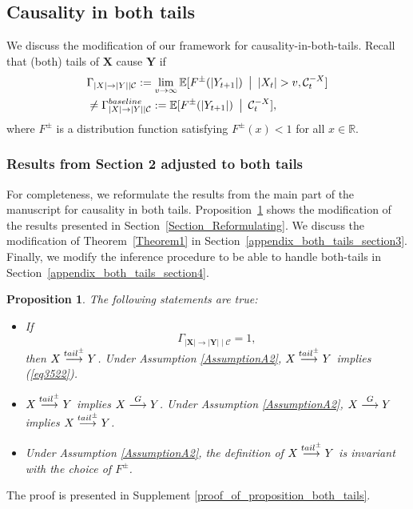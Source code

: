 \documentclass[a4paper,11pt]{article}
\newtheorem{proposition}{Proposition}
\newcommand{\toverset}[2]{\overset{{\rm #1}}{#2}}
\newcommand{\baseline}{{\rm baseline}}
\begin{document}
\subsection{Causality in both tails}\label{Appendix_A_both_tails}

We discuss the modification of our framework for causality-in-both-tails. Recall that (both) tails of $\textbf{X}$ cause $\textbf{Y}$ if 
\begin{equation*}\label{CTC_both_tails}
\begin{split} &\Gamma_{|\textbf{X}|\to|\textbf{Y}|\mid\mathcal{C}}:=  \lim_{v\to\infty} \mathbb{E}[ F^{\pm}(|Y_{t+1}|)\,\,\,\bigr\vert\,\,\, |X_t|>v,\mathcal{C}^{-\textbf{X}}_t]\\ 
&\neq\Gamma_{|\textbf{X}|\to|\textbf{Y}|\mid\mathcal{C}}^{\baseline}:=\mathbb{E}[F^{\pm}(|Y_{t+1}|)\,\,\,\bigr\vert\,\,\,  \mathcal{C}^{-\textbf{X}}_t],    
\end{split}
\end{equation*}
where $F^{\pm}$ is a distribution function satisfying $F^{\pm}(x)<1$ for all $x\in\mathbb{R}$. 


\subsubsection{Results from Section 2 adjusted to both tails}
For completeness, we reformulate the results from the main part of the manuscript for causality in both tails. Proposition~\ref{Proposition_both_tails} shows the modification of the results presented in Section~\ref{Section_Reformulating}.  We discuss the modification of Theorem~\ref{Theorem1} in Section~\ref{appendix_both_tails_section3}. Finally, we modify the inference procedure to be able to handle both-tails in Section~\ref{appendix_both_tails_section4}.



\begin{proposition}\label{Proposition_both_tails}The following statements are true:
\begin{itemize}
    \item If 
\begin{equation}\label{eq3522}
\Gamma_{|\textbf{X}|\to|\textbf{Y}|\mid\mathcal{C}} = 1,
\end{equation}
then $\textbf{X}\toverset{tail^{\pm}}{\longrightarrow}\textbf{Y}$. Under Assumption \ref{AssumptionA2},  $\textbf{X}\toverset{tail^{\pm}}{\longrightarrow}\textbf{Y}$ implies (\ref{eq3522}).
    \item  $\textbf{X}\toverset{tail^{\pm}}{\longrightarrow}\textbf{Y}$ implies $\textbf{X}\toverset{G}{\longrightarrow}\textbf{Y}$. Under Assumption \ref{AssumptionA2},  $\textbf{X}\toverset{G}{\longrightarrow}\textbf{Y}$ implies $\textbf{X}\toverset{tail^{\pm}}{\longrightarrow}\textbf{Y}$. 
    \item  Under Assumption \ref{AssumptionA2}, the definition of  $\textbf{X}\toverset{tail^{\pm}}{\longrightarrow}\textbf{Y}$ is invariant with the choice of $F^{\pm}$. 
\end{itemize}
\end{proposition}
The proof is presented in Supplement \ref{proof_of_proposition_both_tails}.
\end{document}
